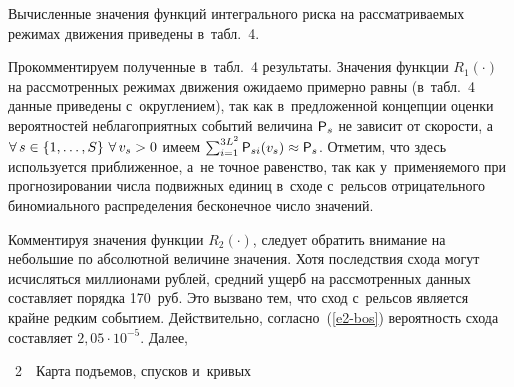 \begin{multicols}{2}
     Вычисленные значения функций интегрального риска на рас\-смат\-ри\-ва\-емых 
режимах движения приведены в~табл.~4.
     

     
     Прокомментируем полученные в~табл.~4 результаты. Значения функции 
$R_1(\cdot)$ на рассмотренных режимах движения ожи\-да\-емо примерно рав\-ны 
(в~табл.~4 данные приведены с~округ\-ле\-ни\-ем), так как в~предложенной концепции 
оценки вероятностей неблагоприятных событий величина ${\sf P}_s$ не зависит от 
скорости, а~$\forall\,s\hm\in \{1,\ldots , S\}\ \forall\,v_s\hm>0$ имеем 
$\sum\nolimits_{i=1}^{3L^2} {\sf P}_{si} (v_s) \hm\approx {\sf P}_s$. Отметим, что здесь 
используется при\-бли\-жен\-ное, а~не точ\-ное равенство, так как у~при\-ме\-ня\-емо\-го при 
прогнозировании чис\-ла по\-движ\-ных единиц в~сходе с~рельсов отрицательного 
биномиального распределения бес\-ко\-неч\-ное чис\-ло значений.



     
     Комментируя значения функции $R_2(\cdot)$, следует обратить внимание на 
небольшие по абсолютной величине значения. Хотя по\-след\-ст\-вия схода могут 
исчисляться миллионами руб\-лей, сред\-ний ущерб на
рас\-смот\-рен\-ных данных 
со\-став\-ля\-ет порядка 170~руб. Это вызвано тем, что сход с~рельсов является крайне 
ред\-ким событием. Действительно, со\-глас\-но~(\ref{e2-bos})
вероятность схода 
со\-став\-ля\-ет $2{,}05\cdot 10^{-5}$. Далее,\linebreak\vspace*{-12pt}

    \vspace*{-2pt}
\begin{center}
\noindent
{{\tablename~2}\ \ \small{Карта подъемов, спусков и~кривых
}}

\vspace*{3pt}


\end{center}
\end{multicols}
